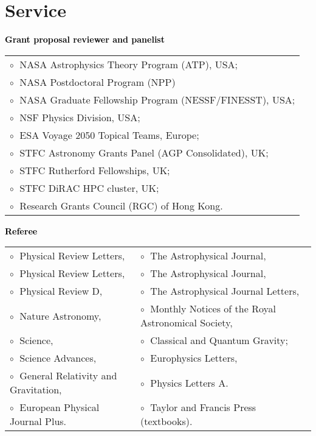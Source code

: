 \documentclass[a4paper]{moderncv}
\begin{document}
\section{Service}

 \textbf{\textcolor{black}{Grant proposal reviewer and panelist}}\vspace{0.1cm}\\
\begin{tabular}{@{\hskip 0.4cm}l}
$\circ\;$ NASA Astrophysics Theory Program (ATP), USA; \\
$\circ\;$ NASA Postdoctoral Program (NPP)\\
$\circ\;$ NASA Graduate Fellowship Program (NESSF/FINESST), USA; \\
$\circ\;$ NSF Physics Division, USA;
\\
$\circ\;$ ESA Voyage 2050 Topical Teams, Europe;
 \\
$\circ\;$ STFC Astronomy Grants Panel (AGP Consolidated), UK;
\\
$\circ\;$ STFC Rutherford Fellowships, UK;
\\
$\circ\;$ STFC DiRAC HPC cluster, UK;
\\
$\circ\;$ Research Grants Council (RGC) of Hong Kong.
\end{tabular}
\vspace{0.2cm}



\textbf{\textcolor{black}{Referee}}\vspace{0.1cm}\\
\begin{tabular}{@{\hskip 0.4cm}l@{\hskip 0.4in}l}
$\circ\;$ Physical Review Letters, & $\circ\;$ The Astrophysical Journal,   \\
$\circ\;$ Physical Review Letters, & $\circ\;$ The Astrophysical Journal,   \\
$\circ\;$ Physical Review D, & $\circ\;$ The Astrophysical Journal  Letters,  \\
$\circ\;$ Nature Astronomy,  & $\circ\;$ Monthly Notices of the Royal Astronomical Society, \\
$\circ\;$ Science,  & $\circ\;$ Classical and Quantum Gravity; \\
$\circ\;$ Science Advances, & $\circ\;$  Europhysics Letters, \\
$\circ\;$ General Relativity and Gravitation, &  $\circ\;$ Physics Letters A. \\
$\circ\;$ European Physical Journal Plus.  &  $\circ\;$ Taylor and Francis Press (textbooks).
\end{tabular}
\vspace{0.2cm}
 
\end{document}
